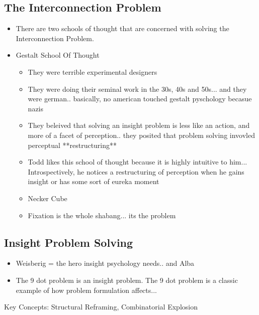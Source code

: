 \documentclass[twoside]{article}
\begin{document}
\subsection{The Interconnection Problem}
\begin{itemize}
  \item There are two schools of thought that are concerned with solving the
        Interconnection Problem.
  \item Gestalt School Of Thought
    \begin{itemize}
      \item They were terrible experimental designers
      \item They were doing their seminal work in the 30s, 40s and 50s... and
            they were german.. basically, no american touched gestalt pyschology
            becasue nazis
      \item They beleived that solving an insight problem is less like an action,
            and more of a facet of perception.. they posited that problem solving
            invovled perceptual **restructuring**
      \item Todd likes this school of thought because it is highly intuitive to
            him... Introspectively, he notices a restructuring of perception when
            he gains insight or has some sort of eureka moment
      \item Necker Cube
      \item Fixation is the whole shabang... its the problem
    \end{itemize}
\end{itemize}

\subsection{Insight Problem Solving}
\begin{itemize}
  \item Weisberig = the hero insight psychology needs.. and Alba
  \item The 9 dot problem is an insight problem. The 9 dot problem is a classic
        example of how problem formulation affects...
\end{itemize}

Key Concepts: Structural Reframing, Combinatorial Explosion
\end{document}
